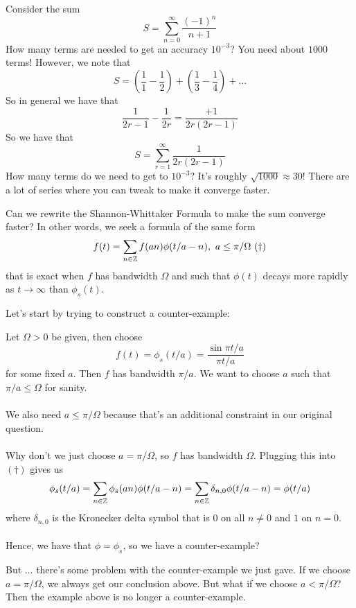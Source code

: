 \documentclass{article}
\begin{document}
\begin{example}
    Consider the sum
    \[S = \sum_{n = 0}^\infty \frac{(-1)^n}{n+1}\]
    How many terms are needed to get an accuracy $10^{-3}$? You need about $1000$ terms! However, we note that
    \[S = (\frac{1}{1} - \frac{1}{2}) + (\frac{1}{3} - \frac{1}{4}) + ...\]
    So in general we have that
    \[\frac{1}{2r - 1} - \frac{1}{2r} = \frac{+1}{2r(2r - 1)}\]
    So we have that
    \[S = \sum_{r = 1}^\infty \frac{1}{2r(2r - 1)}\]
    How many terms do we need to get to $10^{-3}$? It's roughly $\sqrt{1000} \approx 30$! There are a lot of series where you can tweak to make it converge faster.
\end{example}

\begin{question}
    Can we rewrite the Shannon-Whittaker Formula to make the sum converge faster? In other words, we seek a formula of the same form
    \[f(t) = \sum_{n \in \mathbb{Z}} f(an) \phi(t/a - n),\ a \leq \pi/\Omega\ (\dagger)\]
    that is exact when $f$ has bandwidth $\Omega$ and such that $\phi(t)$ decays more rapidly as $t \to \infty$ than $\phi_s(t)$.
\end{question}

Let's start by trying to construct a counter-example:

\begin{example}
    Let $\Omega > 0$ be given, then choose
    \[f(t) = \phi_s(t/a) = \frac{\sin \pi t/a}{\pi t/a}\]
    for some fixed $a$. Then $f$ has bandwidth $\pi/a$. We want to choose $a$ such that $\pi/a \leq \Omega$ for sanity.\\\\
    We also need $a \leq \pi/\Omega$ because that's an additional constraint in our original question.\\\\
    Why don't we just choose $a = \pi/\Omega$, so $f$ has bandwidth $\Omega$. Plugging this into $(\dagger)$ gives us
    \[\phi_s(t/a) = \sum_{n \in \mathbb{Z}} \phi_s(an) \phi(t/a - n) = \sum_{n \in \mathbb{Z}} \delta_{n, 0} \phi(t/a - n) = \phi(t/a) \]
    where $\delta_{n, 0}$ is the Kronecker delta symbol that is $0$ on all $n \neq 0$ and $1$ on $n = 0$.\\\\
    Hence, we have that $\phi = \phi_s$, so we have a counter-example?
\end{example}

But ... there's some problem with the counter-example we just gave. If we choose $a = \pi/\Omega$, we always get our conclusion above. But what if we choose $a < \pi/\Omega$? Then the example above is no longer a counter-example.\\
\end{document}
